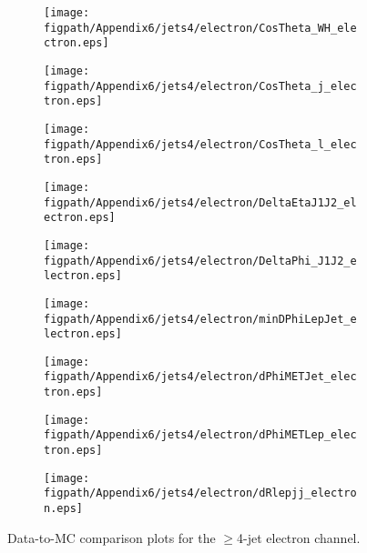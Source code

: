 \begin{figure}[!hbtp]
    \centering
    \begin{subfigure}[t]{0.317\textwidth}
        \texttt{[image: \\figpath/Appendix6/jets4/electron/CosTheta\_WH\_electron.eps]}
    \end{subfigure}
    \begin{subfigure}[t]{0.317\textwidth}
        \texttt{[image: \\figpath/Appendix6/jets4/electron/CosTheta\_j\_electron.eps]}
    \end{subfigure}
    \begin{subfigure}[t]{0.317\textwidth}
        \texttt{[image: \\figpath/Appendix6/jets4/electron/CosTheta\_l\_electron.eps]}
    \end{subfigure}

    \begin{subfigure}[t]{0.317\textwidth}
        \texttt{[image: \\figpath/Appendix6/jets4/electron/DeltaEtaJ1J2\_electron.eps]}
    \end{subfigure}
    \begin{subfigure}[t]{0.317\textwidth}
        \texttt{[image: \\figpath/Appendix6/jets4/electron/DeltaPhi\_J1J2\_electron.eps]}
    \end{subfigure}
    \begin{subfigure}[t]{0.317\textwidth}
        \texttt{[image: \\figpath/Appendix6/jets4/electron/minDPhiLepJet\_electron.eps]}
    \end{subfigure}

    \begin{subfigure}[t]{0.317\textwidth}
        \texttt{[image: \\figpath/Appendix6/jets4/electron/dPhiMETJet\_electron.eps]}
    \end{subfigure}
    \begin{subfigure}[t]{0.317\textwidth}
        \texttt{[image: \\figpath/Appendix6/jets4/electron/dPhiMETLep\_electron.eps]}
    \end{subfigure}
    \begin{subfigure}[t]{0.317\textwidth}
        \texttt{[image: \\figpath/Appendix6/jets4/electron/dRlepjj\_electron.eps]}
    \end{subfigure}
    \caption{Data-to-MC comparison plots for the $\geqslant$4-jet electron channel.}
    \label{fig:comparison_plots_jets4_electron_1}
\end{figure}

